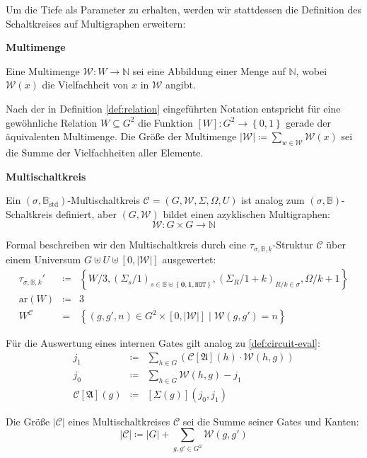 Um die Tiefe als Parameter zu erhalten, werden wir stattdessen die
Definition des Schaltkreises auf Multigraphen erweitern:
\begin{defn}
\textbf{Multimenge}

Eine Multimenge $\mathcal{W}:W\rightarrow\mathbb{N}$ sei eine Abbildung
einer Menge auf $\mathbb{N}$, wobei $\mathcal{W}\left(x\right)$
die Vielfachheit von $x$ in $\mathcal{W}$ angibt.
\end{defn}
Nach der in Definition \ref{def:relation} eingeführten Notation entspricht
für eine gewöhnliche Relation $W\subseteq G^{2}$ die Funktion $\left[W\right]:G^{2}\rightarrow\left\{ 0,1\right\} $
gerade der äquivalenten Multimenge. Die Größe der Multimenge $\left|\mathcal{W}\right|\coloneqq\sum_{w\in\mathcal{W}}\mathcal{W}\left(x\right)$
sei die Summe der Vielfachheiten aller Elemente.
\begin{defn}
\textbf{Multischaltkreis}

Ein $\left(\sigma,\mathbb{B}_{\mathrm{std}}\right)$-Multischaltkreis
$\mathcal{C}=\left(G,\mathcal{W},\Sigma,\Omega,U\right)$ ist analog
zum $\left(\sigma,\mathbb{B}\right)$-Schaltkreis definiert, aber
$\left(G,\mathcal{W}\right)$ bildet einen azyklischen Multigraphen:
\[
\mathcal{W}:G\times G\rightarrow\mathbb{N}
\]

Formal beschreiben wir den Multischaltkreis durch eine $\tau_{\sigma,\mathbb{B},k}$-Struktur
$\mathcal{C}$ über einem Universum $G\uplus U\uplus\left[0,\left|\mathcal{W}\right|\right]$
ausgewertet:
\begin{eqnarray*}
\tau_{\sigma,\mathbb{B},k}' & \coloneqq & \left\{ W/3,\left(\Sigma_{s}/1\right)_{s\in\mathbb{B}\uplus\left\{ \mathbf{0},\mathbf{1},\mathtt{NOT}\right\} },\left(\Sigma_{R}/1+k\right)_{R/k\in\sigma},\Omega/k+1\right\} \\
\mathrm{ar}\left(W\right) & \coloneqq & 3\\
W^{\mathcal{C}} & = & \left\{ \left(g,g',n\right)\in G^{2}\times\left[0,\left|\mathcal{W}\right|\right]\mid\mathcal{W}\left(g,g'\right)=n\right\} 
\end{eqnarray*}

Für die Auswertung eines internen Gates gilt analog zu \ref{def:circuit-eval}:
\begin{eqnarray*}
j_{1} & \coloneqq & \sum_{h\in G}\left(\mathcal{C}\left[\mathfrak{A}\right]\left(h\right)\cdot\mathcal{W}\left(h,g\right)\right)\\
j_{0} & \coloneqq & \sum_{h\in G}\mathcal{W}\left(h,g\right)-j_{1}\\
\mathcal{C}\left[\mathfrak{A}\right]\left(g\right) & \coloneqq & \left[\Sigma\left(g\right)\right]\left(j_{0},j_{1}\right)
\end{eqnarray*}
\end{defn}
Die Größe $\left|\mathcal{C}\right|$ eines Multischaltkreises $\mathcal{C}$
sei die Summe seiner Gates und Kanten:
\[
\left|\mathcal{C}\right|\coloneqq\left|G\right|+\sum_{g,g'\in G^{2}}\mathcal{W}\left(g,g'\right)
\]

